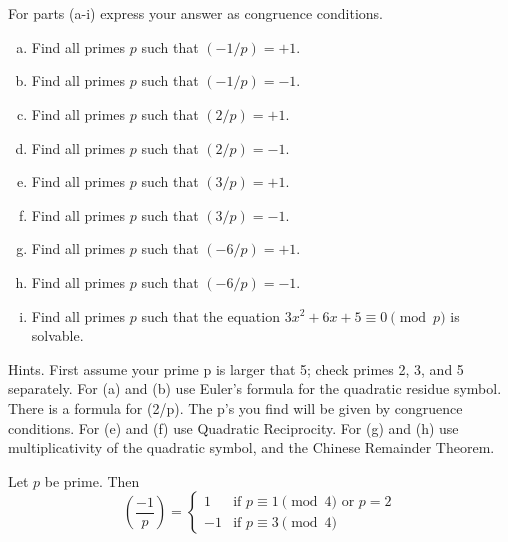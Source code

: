 \section{}

For parts (a-i) express your answer as congruence conditions.
\begin{enumerate}[(a)]
\item Find all primes $p$ such that $(-1/p) = +1$. 
\item Find all primes $p$ such that $(-1/p) = -1$. 
\item Find all primes $p$ such that $(2/p) = +1$.
\item Find all primes $p$ such that $(2/p) = -1$.
\item Find all primes $p$ such that $(3/p) = +1$.
\item Find all primes $p$ such that $(3/p) = -1$.
\item Find all primes $p$ such that $(-6/p) = +1$. 
\item Find all primes $p$ such that $(-6/p) = -1$. 
\item Find all primes $p$ such that the equation
$3x^2 + 6x + 5 \equiv 0 \pmod{p}$ is solvable.
\end{enumerate}

Hints.  First assume your prime p is larger that 5; check primes 2, 3, and 5 
separately.  For (a) and (b) use Euler's formula for the quadratic residue 
symbol. There is a formula for (2/p). The p's you find will be given by
congruence conditions. For (e) and (f) use Quadratic Reciprocity. For (g) and 
(h) use multiplicativity of the quadratic symbol, and the Chinese Remainder 
Theorem.


\begin{prop}
Let $p$ be prime. Then
\[
\left( \dfrac{-1}{p} \right)  = 
\begin{cases} 
	1  &\text{if } p \equiv 1 \pmod{4} \text{ or } p=2 \\
	-1 &\text{if } p \equiv 3 \pmod{4}
\end{cases} 
\]
\end{prop}

